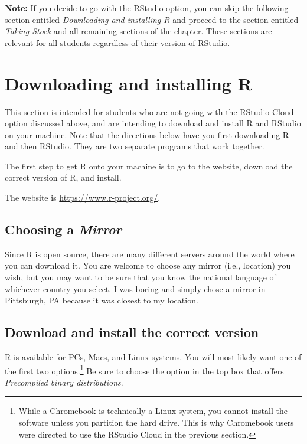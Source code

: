 \documentclass[
]{book}
\begin{document}
\textbf{Note:} If you decide to go with the RStudio option, you can skip the following section entitled \emph{Downloading and installing R} and proceed to the section entitled \emph{Taking Stock} and all remaining sections of the chapter. These sections are relevant for all students regardless of their version of RStudio.

\hypertarget{downloading-and-installing-r}{%
\section{Downloading and installing R}\label{downloading-and-installing-r}}

This section is intended for students who are not going with the RStudio Cloud option discussed above, and are intending to download and install R and RStudio on your machine. Note that the directions below have you first downloading R and then RStudio. They are two separate programs that work together.

The first step to get R onto your machine is to go to the website, download the correct version of R, and install.

The website is \url{https://www.r-project.org/}.

\hypertarget{choosing-a-mirror}{%
\subsection{\texorpdfstring{Choosing a \emph{Mirror}}{Choosing a Mirror}}\label{choosing-a-mirror}}

Since R is open source, there are many different servers around the world where you can download it. You are welcome to choose any mirror (i.e., location) you wish, but you may want to be sure that you know the national language of whichever country you select. I was boring and simply chose a mirror in Pittsburgh, PA because it was closest to my location.

\hypertarget{download-and-install-the-correct-version}{%
\subsection{Download and install the correct version}\label{download-and-install-the-correct-version}}

R is available for PCs, Macs, and Linux systems. You will most likely want one of the first two options.\footnote{While a Chromebook is technically a Linux system, you cannot install the software unless you partition the hard drive. This is why Chromebook users were directed to use the RStudio Cloud in the previous section.} Be sure to choose the option in the top box that offers \emph{Precompiled binary distributions}.
\end{document}
